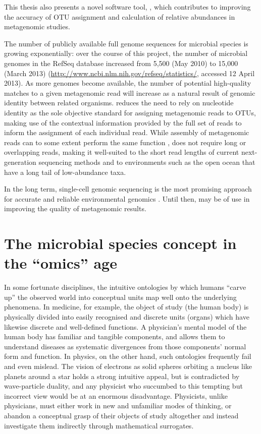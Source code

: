 This thesis also presents a novel software tool, , which contributes to improving the accuracy of \ac{OTU} assignment and calculation of relative abundances in metagenomic studies.

The number of publicly available full genome sequences for microbial species is growing exponentially: over the course of this project, the number of microbial genomes in the RefSeq database increased from 5,500 (May 2010) to 15,000 (March 2013) (\url{http://www.ncbi.nlm.nih.gov/refseq/statistics/}, accessed 12 April 2013).
As more genomes become available, the number of potential high-quality matches to a given metagenomic read will increase as a natural result of genomic identity between related organisms.
 reduces the need to rely on nucleotide identity as the sole objective standard for assigning metagenomic reads to \acp{OTU}, making use of the contextual information provided by the full set of reads to inform the assignment of each individual read.
While assembly of metagenomic reads can to some extent perform the same function \cite{Temperton:2012fj},  does not require long or overlapping reads, making it well-suited to the short read lengths of current next-generation sequencing methods and to environments such as the open ocean that have a long tail of low-abundance taxa.

In the long term, single-cell genomic sequencing is the most promising approach for accurate and reliable environmental genomics \cite{Blainey:2013dp}.
Until then,  may be of use in improving the quality of metagenomic results.

\section{The microbial species concept in the ``omics'' age}

In some fortunate disciplines, the intuitive ontologies by which humans ``carve up'' the observed world into conceptual units map well onto the underlying phenomena.
In medicine, for example, the object of study (the human body) is physically divided into easily recognised and discrete units (organs) which have likewise discrete and well-defined functions.
A physician's mental model of the human body has familiar and tangible components, and allows them to understand diseases as systematic divergences from those components' normal form and function.
In physics, on the other hand, such ontologies frequently fail and even mislead.
The vision of electrons as solid spheres orbiting a nucleus like planets around a star holds a strong intuitive appeal, but is contradicted by wave-particle duality, and any physicist who succumbed to this tempting but incorrect view would be at an enormous disadvantage.
Physicists, unlike physicians, must either work in new and unfamiliar modes of thinking, or abandon a conceptual grasp of their objects of study altogether and instead investigate them indirectly through mathematical surrogates.

